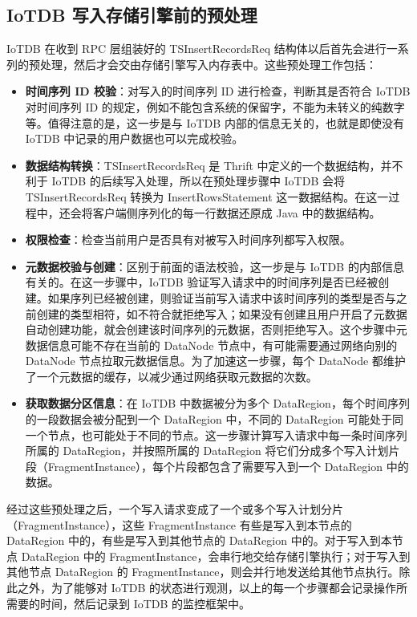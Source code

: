 \subsection{IoTDB 写入存储引擎前的预处理}
IoTDB 在收到 RPC 层组装好的 TSInsertRecordsReq 结构体以后首先会进行一系列的预处理，然后才会交由存储引擎写入内存表中。这些预处理工作包括：
\begin{itemize}
  \item \textbf{时间序列 ID 校验}：对写入的时间序列 ID 进行检查，判断其是否符合 IoTDB 对时间序列 ID 的规定，例如不能包含系统的保留字，不能为未转义的纯数字等。值得注意的是，这一步是与 IoTDB 内部的信息无关的，也就是即使没有 IoTDB 中记录的用户数据也可以完成校验。
  \item \textbf{数据结构转换}：TSInsertRecordsReq 是 Thrift 中定义的一个数据结构，并不利于 IoTDB 的后续写入处理，所以在预处理步骤中 IoTDB 会将 TSInsertRecordsReq 转换为 InsertRowsStatement 这一数据结构。在这一过程中，还会将客户端侧序列化的每一行数据还原成 Java 中的数据结构。
  \item \textbf{权限检查}：检查当前用户是否具有对被写入时间序列都写入权限。
  \item \textbf{元数据校验与创建}：区别于前面的语法校验，这一步是与 IoTDB 的内部信息有关的。在这一步骤中，IoTDB 验证写入请求中的时间序列是否已经被创建。如果序列已经被创建，则验证当前写入请求中该时间序列的类型是否与之前创建的类型相符，如不符合就拒绝写入；如果没有创建且用户开启了元数据自动创建功能，就会创建该时间序列的元数据，否则拒绝写入。这个步骤中元数据信息可能不存在当前的 DataNode 节点中，有可能需要通过网络向别的 DataNode 节点拉取元数据信息。为了加速这一步骤，每个 DataNode 都维护了一个元数据的缓存，以减少通过网络获取元数据的次数。
  \item \textbf{获取数据分区信息}：在 IoTDB 中数据被分为多个 DataRegion，每个时间序列的一段数据会被分配到一个 DataRegion 中，不同的 DataRegion 可能处于同一个节点，也可能处于不同的节点。这一步骤计算写入请求中每一条时间序列所属的 DataRegion，并按照所属的 DataRegion 将它们分成多个写入计划片段（FragmentInstance），每个片段都包含了需要写入到一个 DataRegion 中的数据。
\end{itemize}
经过这些预处理之后，一个写入请求变成了一个或多个写入计划分片（FragmentInstance），这些 FragmentInstance 有些是写入到本节点的 DataRegion 中的，有些是写入到其他节点的 DataRegion 中的。对于写入到本节点 DataRegion 中的 FragmentInstance，会串行地交给存储引擎执行；对于写入到其他节点 DataRegion 的 FragmentInstance，则会并行地发送给其他节点执行。除此之外，为了能够对 IoTDB 的状态进行观测，以上的每一个步骤都会记录操作所需要的时间，然后记录到 IoTDB 的监控框架中。

